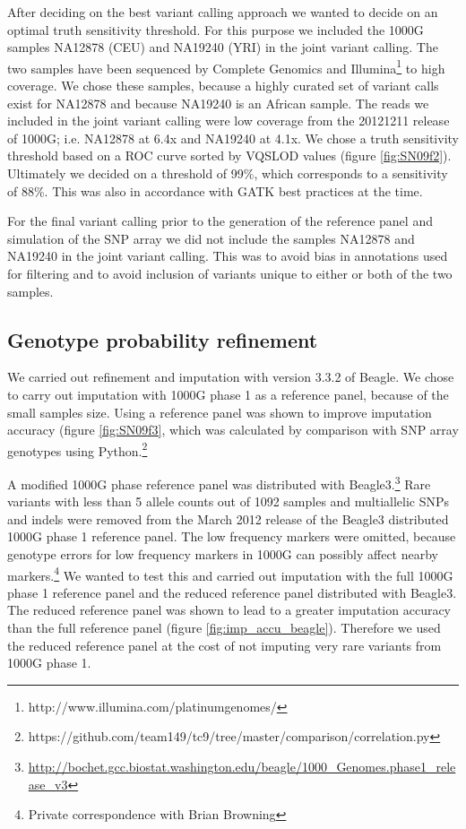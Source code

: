 After deciding on the best variant calling approach we wanted to decide on an optimal truth sensitivity threshold. For this purpose we included the 1000G samples NA12878 (\gls{CEU}) and NA19240 (\gls{YRI}) in the joint variant calling. The two samples have been sequenced by Complete Genomics\cite{Drmanac01012010} and Illumina\footnote{http://www.illumina.com/platinumgenomes/} to high coverage. We chose these samples, because a highly curated set of variant calls exist for NA12878\cite{Zook2014} and because NA19240 is an African sample. The reads we included in the joint variant calling were low coverage from the 20121211 release of 1000G; i.e. NA12878 at 6.4x and NA19240 at 4.1x. We chose a truth sensitivity threshold based on a \gls{ROC} curve sorted by \gls{VQSLOD} values (figure \ref{fig:SN09f2}). Ultimately we decided on a threshold of 99\%, which corresponds to a sensitivity of 88\%. This was also in accordance with \gls{GATK} best practices at the time.


For the final variant calling prior to the generation of the reference panel and simulation of the SNP array we did not include the samples NA12878 and NA19240 in the joint variant calling. This was to avoid bias in annotations used for filtering and to avoid inclusion of variants unique to either or both of the two samples.

\subsection{Genotype probability refinement}
\label{subsec:AGVrefinement}
We carried out refinement and imputation with version 3.3.2 of Beagle.\cite{Browning20071084} We chose to carry out imputation with \gls{1000G} phase 1 as a reference panel, because of the small samples size. Using a reference panel was shown to improve imputation accuracy (figure \ref{fig:SN09f3}, which was calculated by comparison with SNP array genotypes using Python.\footnote{https://github.com/team149/tc9/tree/master/comparison/correlation.py}


A modified 1000G phase reference panel was distributed with Beagle3.\footnote{\url{http://bochet.gcc.biostat.washington.edu/beagle/1000_Genomes.phase1_release_v3}} Rare variants with less than 5 allele counts out of 1092 samples and multiallelic SNPs and indels were removed from the March 2012 release of the Beagle3 distributed 1000G phase 1 reference panel. The low frequency markers were omitted, because genotype errors for low frequency markers in 1000G can possibly affect nearby markers.\footnote{Private correspondence with Brian Browning} We wanted to test this and carried out imputation with the full 1000G phase 1 reference panel and the reduced reference panel distributed with Beagle3. The reduced reference panel was shown to lead to a greater imputation accuracy than the full reference panel (figure \ref{fig:imp_accu_beagle}). Therefore we used the reduced reference panel at the cost of not imputing very rare variants from 1000G phase 1.


